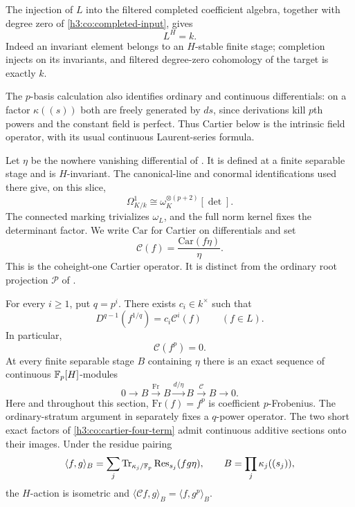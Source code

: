 The injection of $L$ into the filtered completed coefficient algebra,
together with degree zero of \eqref{h3:co:completed-input}, gives
\begin{equation}\label{h3:co:fixed-constants}
 L^H=k.
\end{equation}
Indeed an invariant element belongs to an $H$-stable finite stage;
completion injects on its invariants, and filtered degree-zero cohomology
of the target is exactly $k$.

The $p$-basis calculation also identifies ordinary and continuous
differentials: on a factor $\kappa((s))$ both are freely generated by
$ds$, since derivations kill $p$th powers and the constant field is
perfect.  Thus Cartier below is the intrinsic field operator, with
its usual continuous Laurent-series formula.

Let $\eta$ be the nowhere vanishing differential of
.  It is defined at a finite separable
stage and is $H$-invariant.  The canonical-line and conormal
identifications used there give, on this slice,
\[
 \Omega^1_{K/k}\cong\omega_K^{\otimes(p+2)}[\det].
\]
The connected marking trivializes $\omega_L$, and the full norm kernel
fixes the determinant factor.  We write $\mathrm{Car}$ for Cartier on
differentials and set
\begin{equation}\label{h3:co:cartier-definition}
 \mathcal C(f)=\frac{\mathrm{Car}(f\eta)}{\eta}.
\end{equation}
This is the coheight-one Cartier operator.  It is distinct from the
ordinary root projection $\mathcal P$ of .

\begin{lemma}\label{h3:co:cartier-trace}
For every $i\geq1$, put $q=p^i$.  There exists $c_i\in k^\times$ such that
\begin{equation}\label{h3:co:cartier-distribution-trace}
 D^{q-1}(f^{1/q})=c_i\mathcal C^i(f)\qquad(f\in L).
\end{equation}
In particular,
\begin{equation}\label{h3:co:cartier-frobenius-zero}
 \mathcal C(f^p)=0.
\end{equation}
At every finite separable stage $B$ containing $\eta$ there is an exact
sequence of continuous $\mathbb F_p[H]$-modules
\begin{equation}\label{h3:co:cartier-four-term}
 0\longrightarrow B\xrightarrow{\mathrm{Fr}}B
 \xrightarrow{d/\eta}B\xrightarrow{\mathcal C}B\longrightarrow0.
\end{equation}
Here and throughout this section, \(\mathrm{Fr}(f)=f^p\) is coefficient
\(p\)-Frobenius.  The ordinary-stratum argument in
 separately fixes a \(q\)-power operator.
The two short exact factors of \eqref{h3:co:cartier-four-term} admit
continuous additive sections onto their images.  Under the residue pairing
\begin{equation}\label{h3:co:residue-pairing}
 \langle f,g\rangle_B
 =\sum_j\operatorname{Tr}_{\kappa_j/\mathbb F_p}\operatorname{Res}_{s_j}(fg\eta),
 \qquad B=\prod_j\kappa_j((s_j)),
\end{equation}
the $H$-action is isometric and
$\langle\mathcal C f,g\rangle_B=\langle f,g^p\rangle_B$.
\end{lemma}

